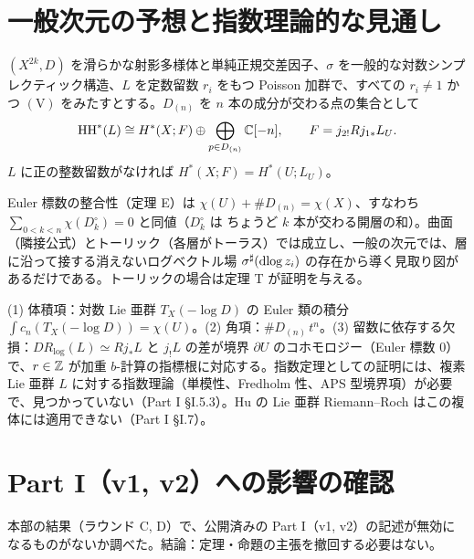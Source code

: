 \section{一般次元の予想と指数理論的な見通し}\label{p2:sec:conj}
\begin{conj}[一般の単純正規交差の対数シンプレクティック多様体]\tK\label{p2:conj:gen}
$(X^{2k},D)$ を滑らかな射影多様体と単純正規交差因子、$\sigma$ を一般的な対数シンプレクティック構造、$L$ を定数留数 $r_i$ をもつ Poisson 加群で、すべての $r_i\ne1$ かつ $\mathrm{(V)}$ をみたすとする。$D_{(n)}$ を $n$ 本の成分が交わる点の集合として
\[\mathrm{HH}^*(L)\cong H^*(X;F)\oplus\bigoplus_{p\in D_{(n)}}\mathbb C[-n],\qquad F=j_{2!}Rj_{1*}L_U.\]
$L$ に正の整数留数がなければ $H^*(X;F)=H^*(U;L_U)$。
\end{conj}
Euler 標数の整合性（定理 E）は $\chi(U)+\#D_{(n)}=\chi(X)$、すなわち $\sum_{0<k<n}\chi(D_k^\circ)=0$ と同値（$D_k^\circ$ は ちょうど $k$ 本が交わる開層の和）。曲面（隣接公式）とトーリック（各層がトーラス）では成立し\tP、一般の次元では、層に沿って接する消えないログベクトル場 $\sigma^\sharp(\mathrm{dlog}\, z_i)$ の存在から導く見取り図があるだけである\tK。トーリックの場合は定理 T が証明を与える。

\begin{obs}[指数理論的な見通し\ \tK]
(1) 体積項：対数 Lie 亜群 $T_X(-\log D)$ の Euler 類の積分 $\int c_n(T_X(-\log D))=\chi(U)$。(2) 角項：$\#D_{(n)}\,t^n$。(3) 留数に依存する欠損：$DR_{\log}(L)\simeq Rj_*L$ と $j_!L$ の差が境界 $\partial U$ のコホモロジー（Euler 標数 0）で、$r\in\mathbb Z$ が加重 $b$-計算の指標根に対応する。指数定理としての証明には、複素 Lie 亜群 $L$ に対する指数理論（単模性、Fredholm 性、APS 型境界項）が必要で、見つかっていない（Part I \S I.5.3）。Hu の Lie 亜群 Riemann--Roch はこの複体には適用できない（Part I \S I.7）。
\end{obs}

\section{Part I（v1, v2）への影響の確認}\label{p2:sec:chk}
本部の結果（ラウンド C, D）で、公開済みの Part I（v1, v2）の記述が無効になるものがないか調べた。結論：定理・命題の主張を撤回する必要はない。

